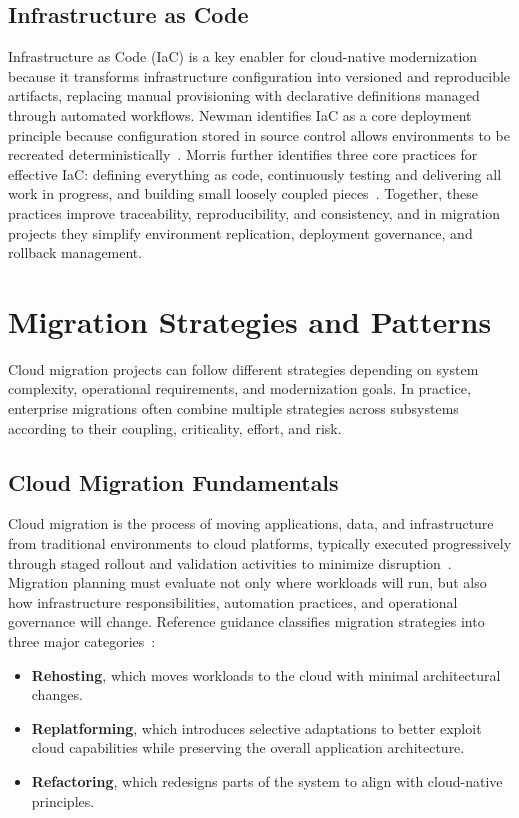 \subsection{Infrastructure as Code}
Infrastructure as Code (IaC) is a key enabler for cloud-native modernization because it transforms infrastructure configuration into versioned and reproducible artifacts, replacing manual provisioning with declarative definitions managed through automated workflows. Newman identifies IaC as a core deployment principle because configuration stored in source control allows environments to be recreated deterministically~\cite{newman2021building}. Morris further identifies three core practices for effective IaC: defining everything as code, continuously testing and delivering all work in progress, and building small loosely coupled pieces~\cite{morris2021iac}. Together, these practices improve traceability, reproducibility, and consistency, and in migration projects they simplify environment replication, deployment governance, and rollback management.

\section{Migration Strategies and Patterns}
Cloud migration projects can follow different strategies depending on system complexity, operational requirements, and modernization goals. In practice, enterprise migrations often combine multiple strategies across subsystems according to their coupling, criticality, effort, and risk.

\subsection{Cloud Migration Fundamentals}
Cloud migration is the process of moving applications, data, and infrastructure from traditional environments to cloud platforms, typically executed progressively through staged rollout and validation activities to minimize disruption~\cite{awsCloudMigrationOverview}. Migration planning must evaluate not only where workloads will run, but also how infrastructure responsibilities, automation practices, and operational governance will change. Reference guidance classifies migration strategies into three major categories~\cite{awsCloudMigrationOverview}:

\begin{itemize}
    \item \textbf{Rehosting}, which moves workloads to the cloud with minimal architectural changes.
    \item \textbf{Replatforming}, which introduces selective adaptations to better exploit cloud capabilities while preserving the overall application architecture.
    \item \textbf{Refactoring}, which redesigns parts of the system to align with cloud-native principles.
\end{itemize}

